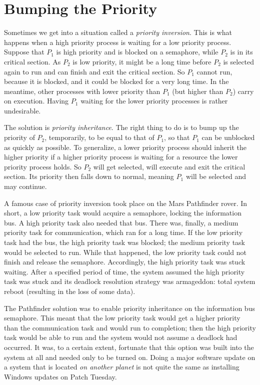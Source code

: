\section*{Bumping the Priority}
Sometimes we get into a situation called a \textit{priority inversion}. This is what happens when a high priority process is waiting for a low priority process. Suppose that $P_{1}$ is high priority and is blocked on a semaphore, while $P_{2}$ is in its critical section. As $P_{2}$ is low priority, it might be a long time before $P_{2}$ is selected again to run and can finish and exit the critical section. So $P_{1}$ cannot run, because it is blocked, and it could be blocked for a very long time. In the meantime, other processes with lower priority than $P_{1}$ (but higher than $P_{2}$) carry on execution. Having $P_{1}$ waiting for the lower priority processes is rather undesirable.

The solution is \textit{priority inheritance}. The right thing to do is to bump up the priority of $P_{2}$, temporarily, to be equal to that of $P_{1}$, so that $P_{1}$ can be unblocked as quickly as possible. To generalize, a lower priority process should inherit the higher priority if a higher priority process is waiting for a resource the lower priority process holds. So $P_{2}$ will get selected, will execute and exit the critical section. Its priority then falls down to normal, meaning $P_{1}$ will be selected and may continue.

A famous case of priority inversion took place on the Mars Pathfinder rover. In short, a low priority task would acquire a semaphore, locking the information bus. A high priority task also needed that bus. There was, finally, a medium priority task for communication, which ran for a long time. If the low priority task had the bus, the high priority task was blocked; the medium priority task would be selected to run. While that happened, the low priority task could not finish and release the semaphore. Accordingly, the high priority task was stuck waiting. After a specified period of time, the system assumed the high priority task was stuck and its deadlock resolution strategy was armageddon: total system reboot (resulting in the loss of some data). 

The Pathfinder solution was to enable priority inheritance on the information bus semaphore. This meant that the low priority task would get a higher priority than the communication task and would run to completion; then the high priority task would be able to run and the system would not assume a deadlock had occurred. It was, to a certain extent, fortunate that this option was built into the system at all and needed only to be turned on. Doing a major software update on a system that is located \textit{on another planet} is not quite the same as installing Windows updates on Patch Tuesday.

